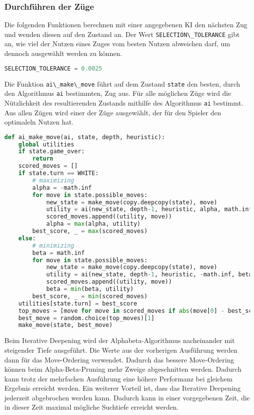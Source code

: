 \hypertarget{durchfuxfchren-der-zuxfcge}{%
\subsubsection{Durchführen der Züge}\label{durchfuxfchren-der-zuxfcge}}

Die folgenden Funktionen berechnen mit einer angegebenen KI den nächsten
Zug und wenden diesen auf den Zustand an. Der Wert
\passthrough{\lstinline!SELECTION\_TOLERANCE!} gibt an, wie viel der
Nutzen eines Zuges vom besten Nutzen abweichen darf, um dennoch
ausgewählt werden zu können.

\begin{lstlisting}[language=Python]
SELECTION_TOLERANCE = 0.0025
\end{lstlisting}

Die Funktion \passthrough{\lstinline!ai\_make\_move!} führt auf dem
Zustand \passthrough{\lstinline!state!} den besten, durch den
Algorithmus \passthrough{\lstinline!ai!} bestimmten, Zug aus. Für alle
möglichen Züge wird die Nützlichkeit des resultierenden Zustands
mithilfe des Algorithmus \passthrough{\lstinline!ai!} bestimmt. Aus
allen Zügen wird einer der Züge ausgewählt, der für den Spieler den
optimaleln Nutzen hat.

\begin{lstlisting}[language=Python]
def ai_make_move(ai, state, depth, heuristic):
    global utilities
    if state.game_over:
        return
    scored_moves = []
    if state.turn == WHITE:
        # maximizing
        alpha = -math.inf
        for move in state.possible_moves:
            new_state = make_move(copy.deepcopy(state), move)
            utility = ai(new_state, depth-1, heuristic, alpha, math.inf)
            scored_moves.append((utility, move))
            alpha = max(alpha, utility)
        best_score, _ = max(scored_moves)
    else:
        # minimizing
        beta = math.inf
        for move in state.possible_moves:
            new_state = make_move(copy.deepcopy(state), move)
            utility = ai(new_state, depth-1, heuristic, -math.inf, beta)
            scored_moves.append((utility, move))
            beta = min(beta, utility)
        best_score, _ = min(scored_moves)
    utilities[state.turn] = best_score
    top_moves = [move for move in scored_moves if abs(move[0] - best_score) <= SELECTION_TOLERANCE]
    best_move = random.choice(top_moves)[1]
    make_move(state, best_move)
\end{lstlisting}

Beim Iterative Deepening wird der Alphabeta-Algorithmus nacheinander mit
steigender Tiefe ausgeführt. Die Werte aus der vorherigen Ausführung
werden dann für das Move-Ordering verwendet. Dadurch das bessere
Move-Ordering können beim Alpha-Beta-Pruning mehr Zweige abgeschnitten
werden. Dadurch kann trotz der mehrfachen Ausführung eine höhere
Performanz bei gleichem Ergebnis erreicht werden. Ein weiterer Vorteil
ist, dass das Iterative Deepening jederzeit abgebrochen werden kann.
Dadurch kann in einer vorgegebenen Zeit, die in dieser Zeit maximal
mögliche Suchtiefe erreicht werden.

